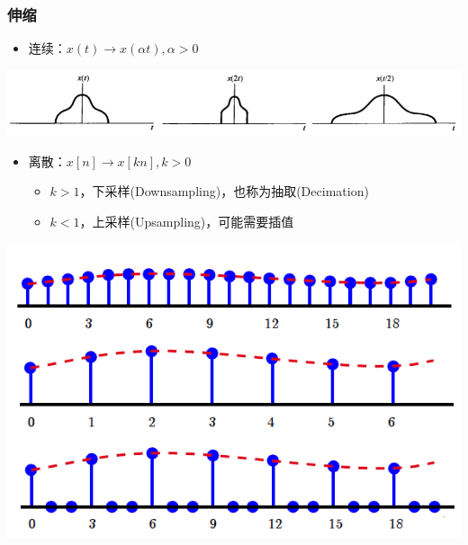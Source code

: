 \documentclass[CJKutf8,xcolor=pdftex,dvipsnames,table]{beamer}
\begin{document}
\begin{CJK*}{UTF8}{song}
  \begin{frame}
    \frametitle{伸缩}
    \begin{itemize}
    \item 连续：$x(t) \rightarrow x(\alpha t), \alpha > 0$
    \end{itemize}
    \begin{center}
      \includegraphics[scale=.4]{cscale}
    \end{center}
    \begin{itemize}
    \item 离散：$x[n] \rightarrow x[kn], k > 0$    
        \begin{itemize}
        \item $k>1$，下采样(Downsampling)，也称为抽取(Decimation)
        \item $k<1$，上采样(Upsampling)，可能需要插值
        \end{itemize}   
    \end{itemize} 
    \begin{center}
      \includegraphics[scale=.28]{dscale}
    \end{center}    
  \end{frame}  


\end{CJK*}
\end{document}
